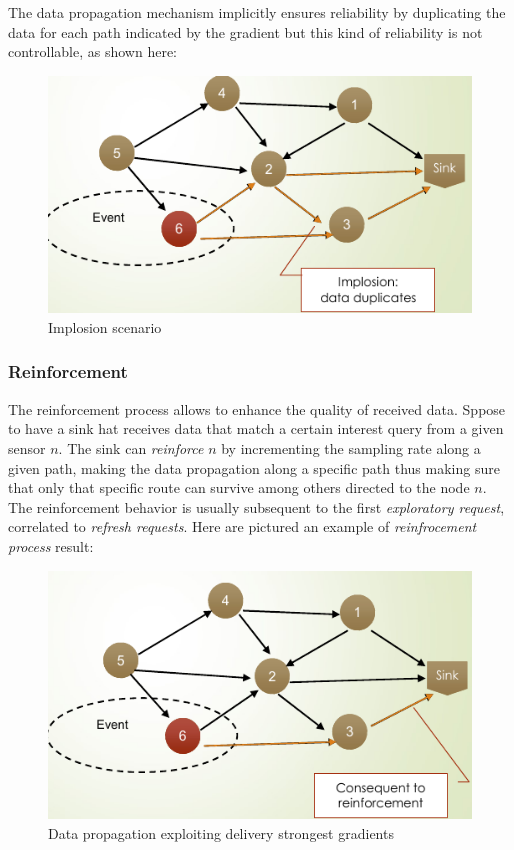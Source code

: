 \documentclass[10pt,a4paper]{report}
\theoremstyle{definition}
\begin{document}
The data propagation mechanism implicitly ensures reliability by duplicating the data for each path indicated by the gradient but this kind of reliability is not controllable, as shown here:
\begin{figure}[h]
	\centering\includegraphics[scale=0.50]{images/Pasted image 20230522174654.png}
	\caption{Implosion scenario}
\end{figure}

\subsubsection{Reinforcement}\label{sec:reinforcement}
The reinforcement process allows to enhance the quality of received data. Sppose to have a sink hat receives data that match a certain interest query from a given sensor $n$. The sink can \textit{reinforce} $n$ by incrementing the sampling rate along a given path, making the data propagation along a specific path thus making sure that only that specific route can survive among others directed to the node $n$.
The reinforcement behavior is usually subsequent to the first \textit{exploratory request}, correlated to \textit{refresh requests}.
Here are pictured an example of \textit{reinfrocement process} result:
\begin{figure}[h]
	\centering\includegraphics[scale=0.50]{images/Pasted image 20230522175151.png}
	\caption{Data propagation exploiting delivery strongest gradients}
\end{figure}
\end{document}
